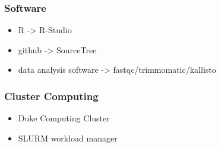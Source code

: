\documentclass{beamer}
\begin{document}
\begin{frame}
\frametitle{Software}
\begin{itemize}
	\item<1-> R -> R-Studio
	\item<2-> github -> SourceTree
	\item<3-> data analysis software -> fastqc/trimmomatic/kallisto
\end{itemize}
\end{frame}
\begin{frame}
\frametitle{Cluster Computing}
\begin{itemize}
	\item Duke Computing Cluster
	\item SLURM workload manager
\end{itemize}
\end{frame}
\end{document}
